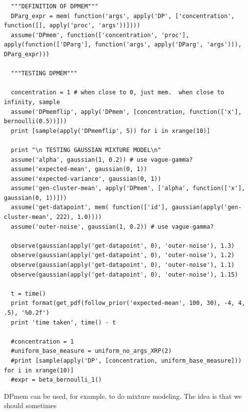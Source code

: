 \documentclass[11pt]{article}
\begin{document}
\begin{small}
\begin{verbatim}
  """DEFINITION OF DPMEM"""
  DParg_expr = mem( function('args', apply('DP', ['concentration', function([], apply('proc', 'args'))])))
  assume('DPmem', function(['concentration', 'proc'], apply(function(['DParg'], function('args', apply('DParg', 'args'))), DParg_expr)))

  """TESTING DPMEM"""

  concentration = 1 # when close to 0, just mem.  when close to infinity, sample 
  assume('DPmemflip', apply('DPmem', [concentration, function(['x'], bernoulli(0.5))]))
  print [sample(apply('DPmemflip', 5)) for i in xrange(10)]

  print "\n TESTING GAUSSIAN MIXTURE MODEL\n"
  assume('alpha', gaussian(1, 0.2)) # use vague-gamma? 
  assume('expected-mean', gaussian(0, 1)) 
  assume('expected-variance', gaussian(0, 1)) 
  assume('gen-cluster-mean', apply('DPmem', ['alpha', function(['x'], gaussian(0, 1))]))
  assume('get-datapoint', mem( function(['id'], gaussian(apply('gen-cluster-mean', 222), 1.0))))
  assume('outer-noise', gaussian(1, 0.2)) # use vague-gamma?

  observe(gaussian(apply('get-datapoint', 0), 'outer-noise'), 1.3)
  observe(gaussian(apply('get-datapoint', 0), 'outer-noise'), 1.2)
  observe(gaussian(apply('get-datapoint', 0), 'outer-noise'), 1.1)
  observe(gaussian(apply('get-datapoint', 0), 'outer-noise'), 1.15)

  t = time()
  print format(get_pdf(follow_prior('expected-mean', 100, 30), -4, 4, .5), '%0.2f')
  print 'time taken', time() - t

  #concentration = 1
  #uniform_base_measure = uniform_no_args_XRP(2)
  #print [sample(apply('DP', [concentration, uniform_base_measure])) for i in xrange(10)]
  #expr = beta_bernoulli_1()

\end{verbatim}
\end{small}


DPmem can be used, for example, to do mixture modeling.  The idea is that we should sometimes


\pagebreak

\begin{thebibliography}{99}



\end{thebibliography}
\end{document}
